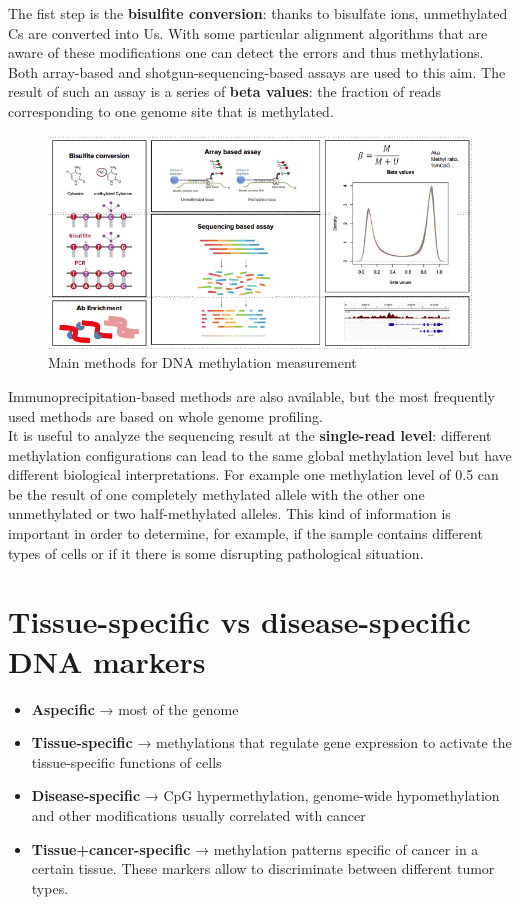 The fist step is the \textbf{bisulfite conversion}: thanks to bisulfate ions,
unmethylated Cs are converted into Us. With some particular alignment algorithms
that are aware of these modifications one can detect the errors and thus
methylations. Both array-based and shotgun-sequencing-based assays are used to
this aim. The result of such an assay is a series of \textbf{beta values}: the
fraction of reads corresponding to one genome site that is methylated.

\begin{figure}[!ht]
\centering
    \includegraphics[width=0.8\linewidth]{methods.png}
    \caption{\label{fig:met}Main methods for DNA methylation measurement}
\end{figure}

Immunoprecipitation-based methods are also available, but the most frequently
used methods are based on whole genome profiling.\\

It is useful to analyze the sequencing result at the \textbf{single-read level}:
different methylation configurations can lead to the same global methylation
level but have different biological interpretations. For example one methylation
level of 0.5 can be the result of one completely methylated allele with the
other one unmethylated or two half-methylated alleles. This kind of information
is important in order to determine, for example, if the sample contains
different types of cells or if it there is some disrupting pathological
situation.


\section{Tissue-specific vs disease-specific DNA markers}

\begin{itemize}
    \item \textbf{Aspecific} → most of the genome
    \item \textbf{Tissue-specific} → methylations that regulate gene expression
    to activate the tissue-specific functions of cells
    \item \textbf{Disease-specific} → CpG hypermethylation, genome-wide
    hypomethylation and other modifications usually correlated with cancer 
    \item \textbf{Tissue+cancer-specific} → methylation patterns specific of
    cancer in a certain tissue. These markers allow to discriminate between
    different tumor types.
\end{itemize}

